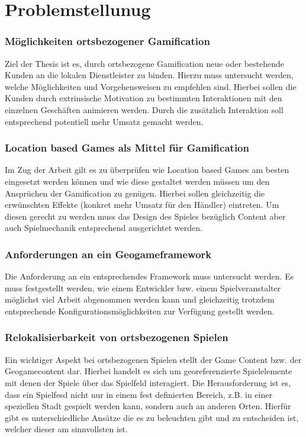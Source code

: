 \chapter{Problemstellunug}
\label{ch2:Problemstellunug}

\subsection*{Möglichkeiten ortsbezogener Gamification}

Ziel der Thesis ist es, durch ortsbezogene Gamification neue oder bestehende Kunden an die lokalen Dienstleister zu binden.
Hierzu muss untersucht werden, welche Möglichkeiten und Vorgehensweisen zu empfehlen sind.
Hierbei sollen die Kunden durch extrinsische Motivation zu bestimmten Interaktionen mit den einzelnen Geschäften animieren werden.
Durch die zusätzlich Interaktion soll entsprechend potentiell mehr Umsatz gemacht werden.

\subsection*{Location based Games als Mittel für Gamification}

Im Zug der Arbeit gilt es zu überprüfen wie Location based Games am besten eingesetzt werden können und wie diese gestaltet werden müssen um den Ansprüchen der Gamification zu genügen. Hierbei sollen gleichzeitig die erwünschten Effekte (konkret mehr Umsatz für den Händler) eintreten. Um diesen gerecht zu werden muss das Design des Spieles bezüglich Content aber auch Spielmechanik entsprechend ausgerichtet werden.

\subsection*{Anforderungen an ein Geogameframework}

Die Anforderung an ein entsprechendes Framework muss untersucht werden. Es muss festgestellt werden, wie einem Entwickler bzw. einem Spielveranstalter möglichst viel Arbeit abgenommen werden kann und gleichzeitig trotzdem entsprechende Konfigurationsmöglichkeiten zur Verfügung gestellt werden.

\subsection*{Relokalisierbarkeit von ortsbezogenen Spielen}

Ein wichtiger Aspekt bei ortsbezogenen Spielen stellt der Game Content bzw. der Geogamecontent dar. Hierbei handelt es sich um georeferenzierte Spielelemente mit denen der Spiele über das Spielfeld interagiert. Die Herausforderung ist es, dass ein Spielfesd nicht nur in einem fest definierten Bereich, z.B. in einer speziellen Stadt gespielt werden kann, sondern auch an anderen Orten. Hierfür gibt es unterschiedliche Ansätze die es zu beleuchten gibt und zu entscheiden ist, welcher dieser am sinnvollsten ist.

